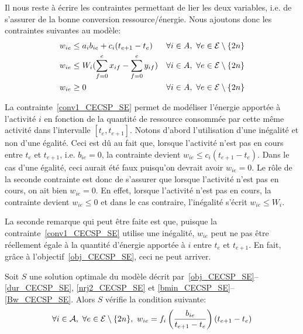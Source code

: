 Il nous reste à écrire les contraintes permettant de lier les deux
variables, i.e.  de s'assurer de la bonne conversion
ressource/énergie. Nous ajoutons donc les contraintes suivantes au
modèle:
\begin{align}
  &w_{ie} \le a_ib_{ie}+c_i(t_{e+1}-t_e) & & \forall i \in A,\ \forall
  e \in {\cal E} \setminus\{2n\} \label{conv1_CECSP_SE}\\
     &w_{ie} \le W_i (\sum_{f=0}^{e} x_{if} -\sum_{f=0}^{e} y_{if}) &
    & \forall i \in A,\ \forall e \in {\cal
      E}\setminus\{2n\} \label{conv2_CECSP_SE}\\
& w_{ie} \ge 0 & & \forall i \in A,\ \forall e \in {\cal
      E}\setminus\{2n\}
\label{Bw_CECSP_SE}
\end{align}

La contrainte~\eqref{conv1_CECSP_SE} permet de modéliser l'énergie
apportée à l'activité $i$ en fonction de la quantité de ressource
consommée par cette même activité dans l'intervalle
$[t_e,t_{e+1}]$. Notons d'abord l'utilisation d'une inégalité et non
d'une égalité. Ceci est dû au fait que, lorsque l'activité n'est pas
en cours entre $t_e$ et $t_{e+1}$, i.e. $b_{ie}=0$, la contrainte
devient $w_{ie} \le c_i(t_{e+1}-t_e)$. Dans le cas d'une égalité, ceci
aurait été faux puisqu'on devrait avoir $w_{ie}=0$. Le rôle de la
seconde contrainte est donc de s'assurer que lorsque l'activité n'est
pas en cours, on ait bien $w_{ie}=0$. En effet, lorsque l'activité
n'est pas en cours, la contrainte devient $w_{ie}\le 0$ et dans le cas
contraire, l'inégalité s'écrit $w_{ie} \le W_i$.

La seconde remarque qui peut être faite est que, puisque la
contrainte~\eqref{conv1_CECSP_SE} utilise une inégalité, $w_{ie}$ peut
ne pas être réellement égale à la quantité d'énergie apportée à $i$
entre $t_e$ et $t_{e+1}$. En fait, grâce à
l'objectif~\eqref{obj_CECSP_SE}, ceci ne peut arriver.

\begin{theo}
  \label{th:conv}
  Soit $S$ une solution optimale du modèle décrit
  par~\eqref{obj_CECSP_SE}--\eqref{dur_CECSP_SE},
  \eqref{nrj2_CECSP_SE} et
  \eqref{bmin_CECSP_SE}--\eqref{Bw_CECSP_SE}. Alors $S$ vérifie la
  condition suivante: \[\forall i \in {\cal A},\ \forall e \in {\cal E}\setminus\{2n\},\
  w_{ie}=f_i\left(\frac{b_{ie}}{t_{e+1}-t_e}\right)(t_{e+1}-t_e)\]
\end{theo}

